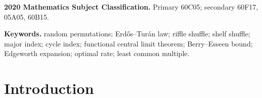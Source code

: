 \documentclass[11pt]{article}
\theoremstyle{definition}
\theoremstyle{remark}
\begin{document}
\begin{abstract}
We verify the criterion for random standardized permutations generated by
i.i.d.\ letters with maximal atom uniformly bounded away from one.  This
gives all results for arbitrary biased riffle shuffles under the same
nonconcentration condition.  In particular, a single ordinary $2$-riffle
shuffle already has the classical functional law, the sharp
Berry--Esseen rate, and the universal first Edgeworth correction, although
its total-variation distance from uniform tends to one.  The same
conclusions hold for major-index-biased permutations in the stated uniform
parameter range.  Using the cycle-index formula of Tripathi, we also prove
the results for one asymmetric shelf shuffle, uniformly over an arbitrary
number of shelves and over asymmetry parameters bounded away from zero and
one.

The arithmetic step is self-contained.  We extract a weighted
additive-to-least-common-multiple transfer theorem from the von Mangoldt
decomposition.  Harmonic one-cycle bounds and harmonic two-cycle factorial
bounds suffice for the functional law, while the quantitative scalar
results follow from the stronger long-cycle coupling.
\end{abstract}

\medskip
\noindent\textbf{2020 Mathematics Subject Classification.}
Primary 60C05; secondary 60F17, 05A05, 60B15.

\smallskip
\noindent\textbf{Keywords.}
random permutations; Erd\H{o}s--Tur\'an law; riffle shuffle; shelf shuffle;
major index; cycle index; functional central limit theorem; Berry--Esseen
bound; Edgeworth expansion; optimal rate; least common multiple.

\tableofcontents

\section{Introduction}
\end{document}
